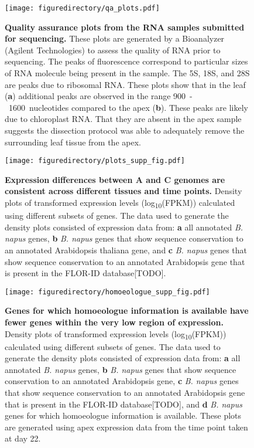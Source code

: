 \documentclass[12pt,]{book}
\begin{document}
\begin{figure}[htbp]
\centering
\texttt{[image: figuredirectory/qa\_plots.pdf]}
\caption{\textbf{Quality assurance plots from the RNA samples submitted
for sequencing.} These plots are generated by a Bioanalyzer (Agilent
Technologies) to assess the quality of RNA prior to sequencing. The
peaks of fluorescence correspond to particular sizes of RNA molecule
being present in the sample. The 5S, 18S, and 28S are peaks due to
ribosomal RNA. These plots show that in the leaf (\textbf{a}) additional
peaks are observed in the range 900~-~1600~nucleotides compared to the
apex (\textbf{b}). These peaks are likely due to chloroplast RNA. That
they are absent in the apex sample suggests the dissection protocol was
able to adequately remove the surrounding leaf tissue from the
apex.}\label{appendixa:qaplots}
\end{figure}

\begin{figure}[htbp]
\centering
\texttt{[image: figuredirectory/plots\_supp\_fig.pdf]}
\caption{\textbf{Expression differences between A and C genomes are
consistent across different tissues and time points.} Density plots of
transformed expression levels (log\textsubscript{10}(FPKM)) calculated
using different subsets of genes. The data used to generate the density
plots consisted of expression data from: \textbf{a} all annotated
\emph{B. napus} genes, \textbf{b} \emph{B. napus} genes that show
sequence conservation to an annotated Arabidopsis thaliana gene, and
\textbf{c} \emph{B. napus} genes that show sequence conservation to an
annotated Arabidopsis gene that is present in the FLOR-ID
database{[}TODO{]}.}\label{appendixa:sampledensity}
\end{figure}

\begin{figure}[htbp]
\centering
\texttt{[image: figuredirectory/homoeologue\_supp\_fig.pdf]}
\caption{\textbf{Genes for which homoeologue information is available
have fewer genes within the very low region of expression.} Density
plots of transformed expression levels (log\textsubscript{10}(FPKM))
calculated using different subsets of genes. The data used to generate
the density plots consisted of expression data from: \textbf{a} all
annotated \emph{B. napus} genes, \textbf{b} \emph{B. napus} genes that
show sequence conservation to an annotated Arabidopsis gene, \textbf{c}
\emph{B. napus} genes that show sequence conservation to an annotated
Arabidopsis gene that is present in the FLOR-ID database{[}TODO{]}, and
\textbf{d} \emph{B. napus} genes for which homoeologue information is
available. These plots are generated using apex expression data from the
time point taken at day 22.}\label{appendixa:homoeologuedensity}
\end{figure}
\end{document}
